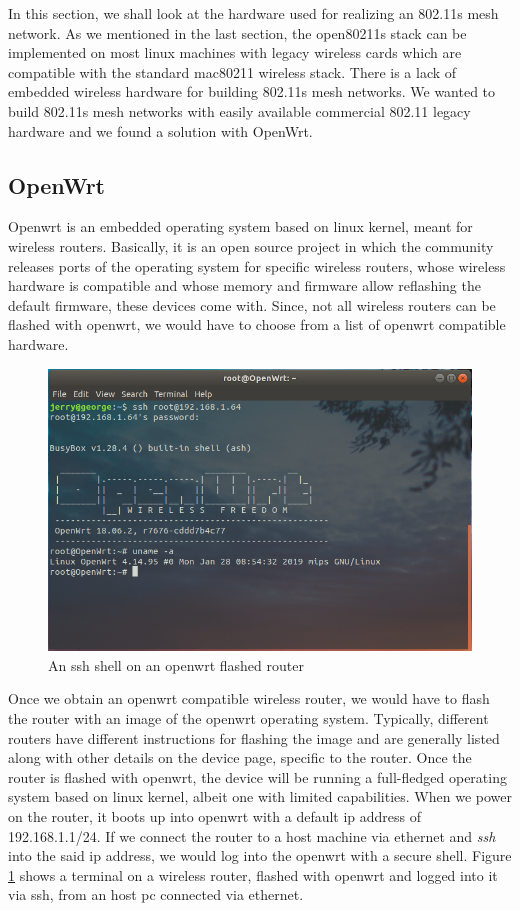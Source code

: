 In this section, we shall look at the hardware used for realizing an 802.11s mesh network. As we mentioned in the last section, the open80211s stack can be implemented on most linux machines with legacy wireless cards which are compatible with the standard mac80211 wireless stack. There is a lack of embedded wireless hardware for building 802.11s mesh networks. We wanted to build 802.11s mesh networks with easily available commercial 802.11 legacy hardware and we found a solution with OpenWrt.

\subsection{OpenWrt}
Openwrt \cite{openwrt} is an embedded operating system based on linux kernel, meant for wireless routers. Basically, it is an open source project in which the community releases ports of the operating system for specific wireless routers, whose wireless hardware is compatible and whose memory and firmware allow reflashing the default firmware, these devices come with. Since, not all wireless routers can be flashed with openwrt, we would have to choose from a list of openwrt compatible hardware.

\begin{figure}
	\centering
	\includegraphics[scale=0.6]{Pictures/ssh4.png}
	\caption{An ssh shell on an openwrt flashed router}
	\label{fig: openwrt-shell}
\end{figure}

Once we obtain an openwrt compatible wireless router, we would have to flash the router with an image of the openwrt operating system. Typically, different routers have different instructions for flashing the image and are generally listed along with other details on the device page, specific to the router. Once the router is flashed with openwrt, the device will be running a full-fledged operating system based on linux kernel, albeit one with limited capabilities. When we power on the router, it boots up into openwrt with a default ip address of 192.168.1.1/24. If we connect the router to a host machine via ethernet and \textit{ssh} into the said ip address, we would log into the openwrt with a secure shell. Figure \ref{fig: openwrt-shell} shows a terminal on a wireless router, flashed with openwrt and logged into it via ssh, from an host pc connected via ethernet.



